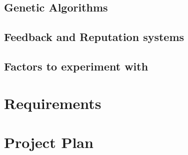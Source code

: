 \documentclass{article}
\begin{document}
\subsection{Genetic Algorithms}
\label{sec:genetic-algorithms}

\subsection{Feedback and Reputation systems}
\label{sec:reputation-systems}

\subsection{Factors to experiment with}
\label{sec:factors-experiment}

\section{Requirements}
\label{sec:requirements}

\section{Project Plan}
\label{sec:project-plan}
\end{document}
